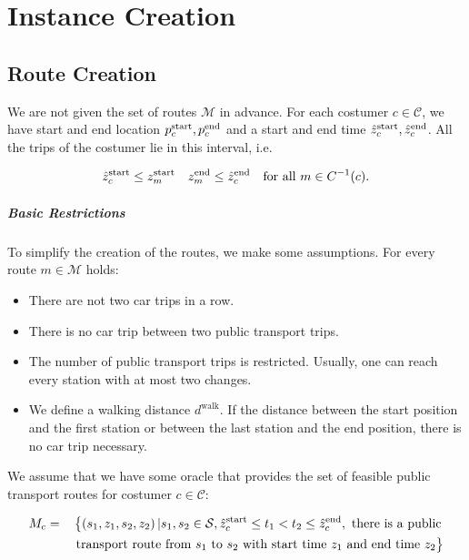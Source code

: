 \chapter{Instance Creation}
\label{ch:instance_creation}

\section{Route Creation}

We are not given the set of routes $\mathcal{M}$ in advance. For each costumer $c\in\mathcal{C}$, we have start and end location $p^{\operatorname{start}}_c, p^{\operatorname{end}}_c$ and a start and end time $\hat{z}^{\operatorname{start}}_c, \hat{z}^{\operatorname{end}}_c$. All the trips of the costumer lie in this interval, i.e.

\begin{align*}
	\hat{z}^{\operatorname{start}}_c \leq z^{\operatorname{start}}_m && z^{\operatorname{end}}_m \leq \hat{z}^{\operatorname{end}}_c && \text{for all } m\in C^{-1}(c).
\end{align*}

\paragraph{Basic Restrictions} \parfill

To simplify the creation of the routes, we make some assumptions. For every route $m\in\mathcal{M}$ holds:

\begin{itemize}
	\item{There are not two car trips in a row.}
	\item{There is no car trip between two public transport trips.}
	\item{The number of public transport trips is restricted. Usually, one can reach every station with at most two changes.}
	\item{We define a walking distance $d^{\operatorname{walk}}$. If the distance between the start position and the first station or between the last station and the end position, there is no car trip necessary.}
\end{itemize}

We assume that we have some oracle that provides the set of feasible public transport routes for costumer $c\in\mathcal{C}$:

\begin{align*}
	M_c & = && \left\{\left(s_1,z_1,s_2,z_2\right)|s_1,s_2\in\mathcal{S}, \zstarto_c\leq t_1 < t_2 \leq \zendo_c, \text{ there is a public} \right. \\
	&&& \left.\vphantom{\zstarto}\text{transport route from $s_1$ to $s_2$ with start time $z_1$ and end time $z_2$}\right\}
\end{align*}

